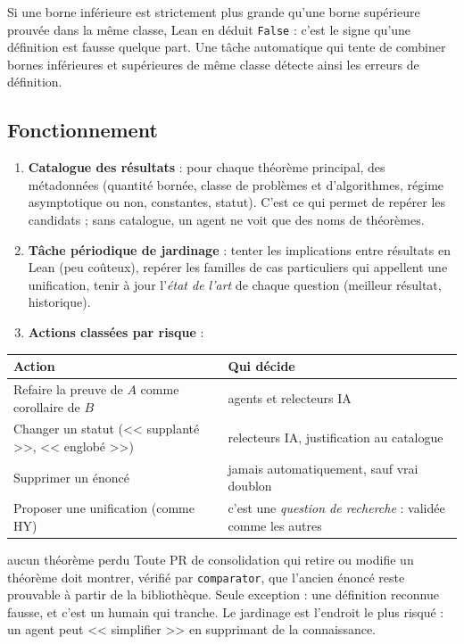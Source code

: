 \documentclass[11pt,a4paper]{article}
\begin{document}
\begin{pourquoi}
Si une borne inférieure est strictement plus grande qu'une borne supérieure prouvée dans la même
classe, Lean en déduit \texttt{False} : c'est le signe qu'une définition est fausse quelque part.
Une tâche automatique qui tente de combiner bornes inférieures et supérieures de même classe
détecte ainsi les erreurs de définition.
\end{pourquoi}

\subsection{Fonctionnement}

\begin{enumerate}
\item \textbf{Catalogue des résultats} : pour chaque théorème principal, des métadonnées (quantité bornée,
  classe de problèmes et d'algorithmes, régime asymptotique ou non, constantes, statut). C'est ce qui
  permet de repérer les candidats ; sans catalogue, un agent ne voit que des noms de théorèmes.
\item \textbf{Tâche périodique de jardinage} : tenter les implications entre résultats en Lean (peu
  coûteux), repérer les familles de cas particuliers qui appellent une unification, tenir à jour
  l'\emph{état de l'art} de chaque question (meilleur résultat, historique).
\item \textbf{Actions classées par risque} :
\end{enumerate}

\begin{center}
\begin{tabularx}{\linewidth}{@{}XX@{}}
\toprule
Action & Qui décide \\
\midrule
Refaire la preuve de $A$ comme corollaire de $B$ & agents et relecteurs IA \\
Changer un statut (<< supplanté >>, << englobé >>) & relecteurs IA, justification au catalogue \\
Supprimer un énoncé & jamais automatiquement, sauf vrai doublon \\
Proposer une unification (comme HY) & c'est une \emph{question de recherche} : validée comme les autres \\
\bottomrule
\end{tabularx}
\end{center}

\begin{regle}{aucun théorème perdu}
Toute PR de consolidation qui retire ou modifie un théorème doit montrer, vérifié par \texttt{comparator},
que l'ancien énoncé reste prouvable à partir de la bibliothèque. Seule exception : une définition
reconnue fausse, et c'est un humain qui tranche. Le jardinage est l'endroit le plus risqué : un agent
peut << simplifier >> en supprimant de la connaissance.
\end{regle}
\end{document}

